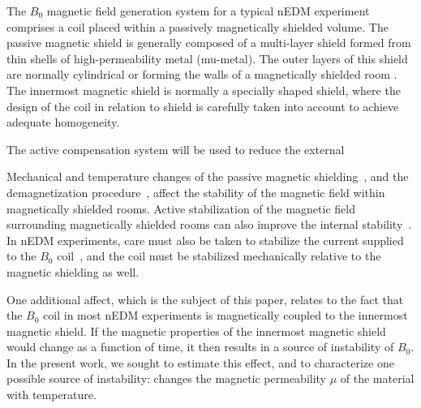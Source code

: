\documentclass[review]{elsarticle}
\begin{document}
The $B_0$ magnetic field generation system for a typical nEDM
experiment comprises a coil placed within a passively magnetically
shielded volume.  The passive magnetic shield is generally composed of
a multi-layer shield formed from thin shells of high-permeability
metal (mu-metal).  The outer layers of this shield are normally
cylindrical \cite{bib:} or forming the walls of a magnetically
shielded room \cite{bib:}.  The innermost magnetic shield is normally
a specially shaped shield, where the design of the coil in relation to
shield is carefully taken into account to achieve adequate
homogeneity.

%
The active compensation system will be used to reduce the external

Mechanical and temperature changes of the passive magnetic
shielding~\cite{bib:voigt,bib:thiel}, and the demagnetization
procedure~\cite{bib:thiel,bib:fierlinger2016}, affect the stability of
the magnetic field within magnetically shielded
rooms.
Active stabilization of the magnetic field surrounding magnetically
shielded rooms can also improve the internal
stability~\cite{bib:franke,bib:voigtorthielorwhat?}.  In nEDM
experiments, care must also be taken to stabilize the current supplied
to the $B_0$ coil~\cite{someoneagain}, and the coil must be stabilized
mechanically relative to the magnetic shielding as well.



One additional affect, which is the subject of this paper, relates to
the fact that the $B_0$ coil in most nEDM experiments is magnetically
coupled to the innermost magnetic shield.  If the magnetic properties
of the innermost magnetic shield would change as a function of time,
it then results in a source of instability of $B_0$.  In the present
work, we sought to estimate this effect, and to characterize one
possible source of instability: changes the magnetic permeability
$\mu$ of the material with temperature.
\end{document}

